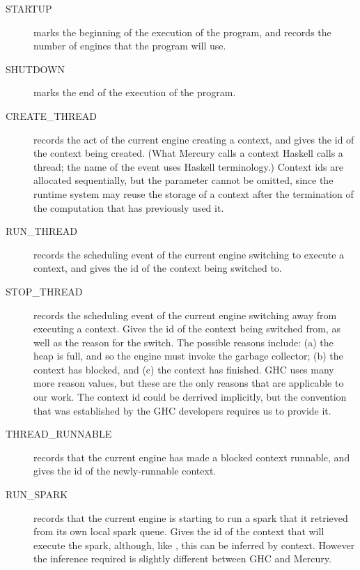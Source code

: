 \begin{description}

\item[STARTUP]
marks the beginning of the execution of the program,
and records the number of engines that the program will use.

\item[SHUTDOWN]
marks the end of the execution of the program.

\item[CREATE\_THREAD]
records the act of the current engine creating a context,
and gives the id of the context being created.
(What Mercury calls a context Haskell calls a thread;
the name of the event uses Haskell terminology.)
Context ids are allocated sequentially,
but the parameter cannot be omitted,
since the runtime system may reuse the storage of a context
after the termination of the computation that has previously used it.

\item[RUN\_THREAD]
records the scheduling event
of the current engine switching to execute a context,
and gives the id of the context being switched to.

\item[STOP\_THREAD]
records the scheduling event
of the current engine switching away from executing a context.
Gives the id of the context being switched from,
as well as the reason for the switch.
The possible reasons include:
(a) the heap is full, and so the engine must invoke the garbage collector;
(b) the context has blocked, and
(c) the context has finished.
GHC uses many more reason values, but these are the only reasons that
are applicable to our work.
The context id could be derrived implicitly,
but the convention that was established by the GHC developers requires us to
provide it.

\item[THREAD\_RUNNABLE]
records that the current engine has made a blocked context runnable,
and gives the id of the newly-runnable context.

\item[RUN\_SPARK]
records that the current engine is starting to run a spark
that it retrieved from its own local spark queue.
Gives the id of the context that will execute the spark,
although, like , this can be inferred by context.
However the inference required is slightly different between GHC and Mercury.


\end{description}
